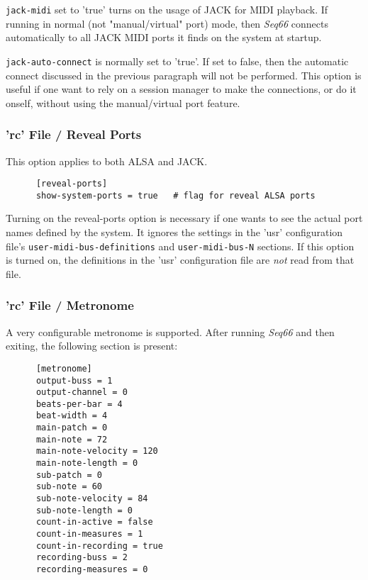    \texttt{jack-midi} set to 'true' turns on the usage of JACK for MIDI
   playback.  If running in normal (not "manual/virtual" port) mode,
   then \textsl{Seq66} connects automatically to all JACK MIDI ports it
   finds on the system at startup.

   \texttt{jack-auto-connect} is normally set to 'true'.  If set to false, then
   the automatic connect discussed in the previous paragraph will not be
   performed.
   This option is useful if one want to rely on a session manager to make the
   connections, or do it onself, without using the manual/virtual port feature.

\subsubsection{'rc' File / Reveal Ports}
\label{subsubsec:configuration_rc_reveal_ports}

   This option applies to both ALSA and JACK.

   \begin{verbatim}
      [reveal-ports]
      show-system-ports = true   # flag for reveal ALSA ports
   \end{verbatim}

   Turning on the reveal-ports option is necessary if one
   wants to see the actual port names defined by the system.
   It ignores the settings in the 'usr' configuration file's
   \texttt{user-midi-bus-definitions} and \texttt{user-midi-bus-N} sections.
   If this option is turned on, the definitions in the
   'usr' configuration file are \textsl{not} read from that file.

\subsubsection{'rc' File / Metronome}
\label{subsubsec:configuration_rc_metronome}

   A very configurable metronome is supported.
   After running \textsl{Seq66} and then
   exiting, the following section is present:

   \begin{verbatim}
      [metronome]
      output-buss = 1
      output-channel = 0
      beats-per-bar = 4
      beat-width = 4
      main-patch = 0
      main-note = 72
      main-note-velocity = 120
      main-note-length = 0
      sub-patch = 0
      sub-note = 60
      sub-note-velocity = 84
      sub-note-length = 0
      count-in-active = false
      count-in-measures = 1
      count-in-recording = true
      recording-buss = 2
      recording-measures = 0
   \end{verbatim}

